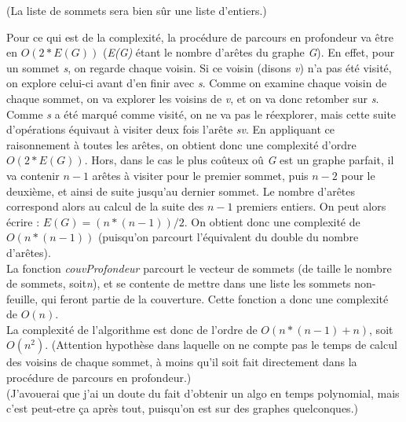(La liste de sommets sera bien s\^ur une liste d'entiers.)

Pour ce qui est de la complexit\'e, la proc\'edure de parcours en profondeur va \^etre en \textit{$O(2*E(G))$} (\textit{E(G)} \'etant le nombre
d'ar\^etes du graphe \textit{G}). En effet, pour un sommet \textit{s}, on regarde chaque voisin. Si ce voisin (disons \textit{v}) n'a pas \'et\'e
visit\'e, on explore celui-ci avant d'en finir avec \textit{s}. Comme on examine chaque voisin de chaque sommet, on va explorer les
voisins de \textit{v}, et on va donc retomber sur \textit{s}. Comme \textit{s} a \'et\'e marqu\'e comme visit\'e, on ne va pas le r\'eexplorer,
mais cette suite d'op\'erations \'equivaut \`a visiter deux fois l'ar\^ete \textit{sv}. En appliquant ce raisonnement \`a toutes les ar\^etes,
on obtient donc une complexit\'e d'ordre \textit{$O(2*E(G))$}. Hors, dans le cas le plus co\^uteux o\^u \textit{G} est un graphe parfait,
il va contenir \textit{$n-1$} ar\^etes \`a visiter pour le premier sommet, puis \textit{$n-2$} pour le deuxi\`eme, et ainsi de suite jusqu'au
dernier sommet. Le nombre d'ar\^etes correspond alors au calcul de la suite des \textit{$n-1$} premiers entiers. On peut alors \'ecrire :
\textit{$ E(G) = ( n*(n-1)) / 2 $}. On obtient donc une complexit\'e de \textit{$O(n*(n-1))$} (puisqu'on parcourt l'\'equivalent du double
du nombre d'ar\^etes).\\

La fonction \textit{couvProfondeur} parcourt le vecteur de sommets (de taille le nombre de sommets, soit\textit{n}), et se contente de mettre
dans une liste les sommets non-feuille, qui feront partie de la couverture. Cette fonction a donc une complexit\'e de \textit{$O(n)$}.\\

La complexit\'e de l'algorithme est donc de l'ordre de \textit{$O( n*(n-1) + n )$}, soit \textit{$O(n^2)$}.
(Attention hypoth\`ese dans laquelle on ne compte pas le temps de calcul des voisins de chaque sommet, \`a moins qu'il soit fait directement
dans la proc\'edure de parcours en profondeur.)\\
(J'avouerai que j'ai un doute du fait d'obtenir un algo en temps polynomial, mais c'est peut-etre \c{c}a apr\`es tout, puisqu'on est sur des
graphes quelconques.)\\
